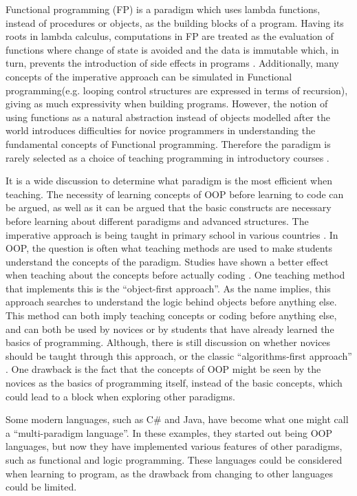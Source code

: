 Functional programming (FP) is a paradigm which uses lambda functions, instead of procedures or objects, as the building blocks of a program. Having its roots in lambda calculus, computations in FP are treated as the evaluation of functions where change of state is avoided and the data is immutable which, in turn, prevents the introduction of side effects in programs \cite{func_programming}. Additionally, many concepts of the imperative approach can be simulated in Functional programming(e.g. looping control structures are expressed in terms of recursion), giving as much expressivity when building programs. However, the notion of using functions as a natural abstraction instead of objects modelled after the world introduces difficulties for novice programmers in understanding the fundamental concepts of Functional programming. Therefore the paradigm is rarely selected as a choice of teaching programming in introductory courses \cite{TeachFuncProgramming}.

It is a wide discussion to determine what paradigm is the most efficient when teaching. The necessity of learning concepts of OOP before learning to code can be argued, as well as it can be argued that the basic constructs are necessary before learning about different paradigms and advanced structures. The imperative approach is being taught in primary school in various countries \cite{dk_scratch}. In OOP, the question is often what teaching methods are used to make students understand the concepts of the paradigm. Studies have shown a better effect when teaching about the concepts before actually coding \cite{Xinogalos15}. One teaching method that implements this is the ``object-first approach''. As the name implies, this approach searches to understand the logic behind objects before anything else. This method can both imply teaching concepts or coding before anything else, and can both be used by novices or by students that have already learned the basics of programming. Although, there is still discussion on whether novices should be taught through this approach, or the classic ``algorithms-first approach'' \cite{Periyamasy12}. One drawback is the fact that the concepts of OOP might be seen by the novices as the basics of programming itself, instead of the basic concepts, which could lead to a block when exploring other paradigms.

Some modern languages, such as C\# and Java, have become what one might call a ``multi-paradigm language''. In these examples, they started out being OOP languages, but now they have implemented various features of other paradigms, such as functional and logic programming. These languages could be considered when learning to program, as the drawback from changing to other languages could be limited.